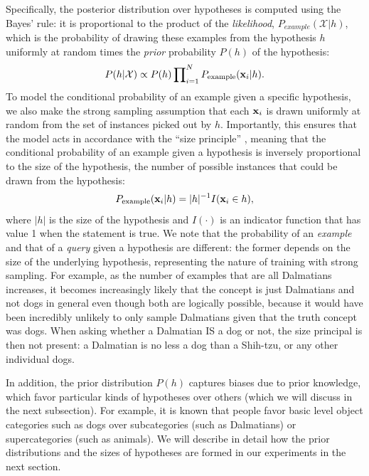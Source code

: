 Specifically, the posterior distribution over hypotheses is computed using the Bayes' rule: it is proportional to the product of the {\em likelihood}, $P_{example}(\mathcal{X} | h)$, which is the probability of drawing these examples from the hypothesis $h$ uniformly at random times the {\em prior} probability $P(h)$ of the hypothesis:
\begin{equation}
    P(h|\mathcal{X}) \propto P(h)\prod\nolimits_{i=1}^{N}P_{\mathrm{example}}(\mathbf{x}_i | h).
\end{equation}
To model the conditional probability of an example given a specific hypothesis, we also make the strong sampling assumption that each $\mathbf{x}_i$ is drawn uniformly at random from the set of instances picked out by $h$. Importantly, this ensures that the model acts in accordance with the ``size principle'' \cite{tenenbaum99,tenenbaum2001generalization}, meaning that the conditional probability of an example given a hypothesis is inversely proportional to the size of the hypothesis, \ie the number of possible instances that could be drawn from the hypothesis:
\begin{equation}
    P_{\mathrm{example}}(\mathbf{x}_i | h) = |h|^{-1}I(\mathbf{x}_i \in h),
\end{equation}
where $|h|$ is the size of the hypothesis and $I(\cdot)$ is an indicator function that has value 1 when the statement is true. We note that the probability of an \emph{example} and that of a \emph{query} given a hypothesis are different: the former depends on the size of the underlying hypothesis, representing the nature of training with strong sampling. For example, as the number of examples that are all Dalmatians increases, it becomes increasingly likely that the concept is just Dalmatians and not dogs in general even though both are logically possible, because it would have been incredibly unlikely to only sample Dalmatians given that the truth concept was dogs. When asking whether a Dalmatian IS a dog or not, the size principal is then not present: a Dalmatian is no less a dog than a Shih-tzu, or any other individual dogs.

In addition, the prior distribution $P(h)$ captures biases due to prior knowledge, which favor particular kinds of hypotheses over others (which we will discuss in the next subsection). For example, it is known that people favor basic level object categories such as dogs over subcategories (such as Dalmatians) or supercategories (such as animals). We will describe in detail how the prior distributions and the sizes of hypotheses are formed in our experiments in the next section.

